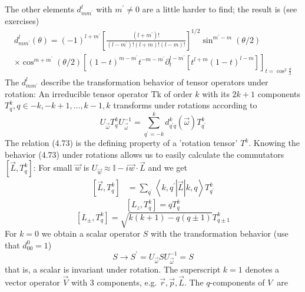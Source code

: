 The other elements $d^l_{mm^{\prime}}$ with $m^{\prime}\neq 0$ are a little harder to find; the result is (see exercises)
\begin{equation}
\begin{array}{l}{d_{m m^{\prime}}^{l}(\theta)=(-1)^{l+m^{\prime}}\left[\frac{\left(l+m^{\prime}\right) !}{\left(l-m^{\prime}\right) !(l+m) !(l-m) !}\right]^{1 / 2} \sin ^{m^{\prime}-m}(\theta / 2)} \\ {\times \cos ^{m+m^{\prime}}(\theta / 2)\left[(1-t)^{m-m^{\prime}} t^{-m-m^{\prime}} \partial_{t}^{l-m^{\prime}}\left[t^{l+m}(1-t)^{l-m}\right]\right]_{t=\cos ^{2} \frac{\theta}{2}}}\end{array}
\end{equation}
The $d^l_{mm^{\prime}}$ describe the transformation behavior of tensor operators under rotation: An irreducible tensor operator Tk of order $k$ with its $2k + 1$ components $T^k_q, q \in {-k, -k + 1, \dots, k-1, k}$ transforms under rotations according to
\begin{equation}
    U_{\vec{\omega}} T_{q}^{k} U_{\vec{\omega}}^{-1}=\sum_{q^{\prime}=-k}^{k} d_{q^{\prime} q}^{k}(\vec{\omega}) T_{q^{\prime}}^{k}
    \end{equation}
The relation (4.73) is the defining property of a 'rotation tensor' $T^k$. Knowing the behavior (4.73) under rotations allows us to easily calculate the commutators $[\vec{L}, T^k_q]$: For small $\vec{w}$ is $U_{\vec{w}}\approx \mathbb{I}-i\vec{w}\cdot\vec{L}$ and we get
\begin{equation}
\begin{aligned}
    \left[\vec{L}, T_{q}^{k}\right] &=\sum_{q^{\prime}}\left\langle k, q^{\prime}|\vec{L}| k, q\right\rangle T_{q^{\prime}}^{k} 
\end{aligned}
\end{equation}
\begin{equation}
    \left[L_{z}, T_{q}^{k}\right] =q T_{q}^{k} 
\end{equation}
\begin{equation}
    \left[L_{\pm}, T_{q}^{k}\right] =\sqrt{k(k+1)-q(q \pm 1)} T_{q \pm 1}^{k} 
\end{equation}
For $k = 0$ we obtain a scalar operator $S$ with the transformation behavior (use that $d^0_{00} = 1$)
\begin{equation}
    S \rightarrow S^{\prime}=U_{\vec{\omega}} S U_{\vec{\omega}}^{-1}=S
    \end{equation}
that is, a scalar is invariant under rotation.
The superscript $k = 1$ denotes a vector operator $\vec{V}$ with 3 components, e.g. $\vec{r},\vec{p},\vec{L}$. The $q$-components of $V ~$ are

